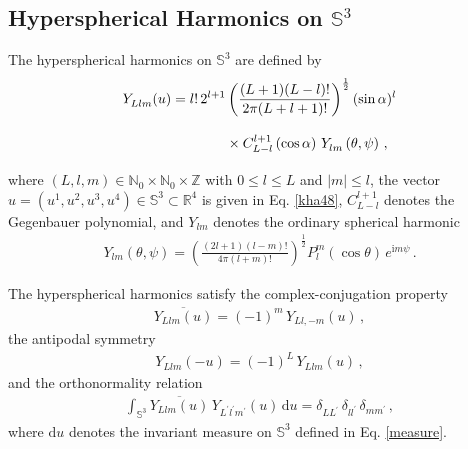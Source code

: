 \documentclass[aps,twocolumn,nofootinbib]{revtex4}
\begin{document}
{\begin{appendix}
\subsection{Hyperspherical Harmonics on $\mathbb{S}_{}^3$}\label{A-Hyp-Har}

The hyperspherical harmonics on $\mathbb{S}^3$ are defined by
\begin{align}
    Y_{Llm}^{}(u) = l!\,2_{}^{l+1}&  \left(\frac{(L+1)(L-l)!}{2\pi (L+l+1)!}\right)_{}^{\frac{1}{2}}(\sin \alpha)_{}^l \nonumber \\
    & \vphantom{\left(\frac{(L+1)(L-l)!}{2\pi (L+l+1)!}\right)^{\frac{1}{2}}} \times  C_{L-l}^{l+1}\left(\cos \alpha\right)\, Y_{lm}^{}\left(\theta, \psi\right)\,,
\end{align}
where $(L, l, m) \in \mathbb{N}_0^{} \times \mathbb{N}_0^{} \times \mathbb{Z}$ with $0 \leqslant l \leqslant L$ and $|m| \leqslant l$, the vector $u = (u_{}^1, u_{}^2, u_{}^3, u_{}^4)\in \mathbb{S}_{}^3 \subset \mathbb{R}_{}^4$ is given in Eq. \eqref{kha48}, $C_{L-l}^{l+1}$ denotes the Gegenbauer polynomial, and $Y_{lm}^{}$ denotes the ordinary spherical harmonic
\begin{align}
    Y_{lm}^{}(\theta, \psi) = \left({\frac{(2l + 1)(l - m)!}{4\pi(l + m)!}}\right)^{\frac{1}{2}} P_l^m(\cos \theta) \, e_{}^{\mathrm{i}m\psi}\,.
\end{align}

The hyperspherical harmonics satisfy the complex-conjugation property
\begin{align} \label{cop}
    \overline{Y_{Llm}(u)}=(-1)^m \, Y_{Ll,-m}(u)\,,
\end{align}
the antipodal symmetry
\begin{align}\label{antipodal-Yllm1}
    Y_{Llm}(-u) = (-1)^L\, Y_{Llm}(u) \,,
\end{align}
and the orthonormality relation
\begin{align}\label{or-re}
    \int_{{\mathbb{S}}^3} \overline{Y_{Llm}^{}(u)}\, Y_{L_{}^\prime l_{}^\prime m_{}^\prime}(u) \, \mathrm{d}u = \delta_{LL_{}^\prime}^{} \,\delta_{ll_{}^\prime} \,\delta_{mm_{}^\prime}\,, 
\end{align}
where $\mathrm{d}u$ denotes the invariant measure on ${\mathbb{S}}^3$ defined in Eq. \eqref{measure}.



\end{appendix}}
\end{document}

